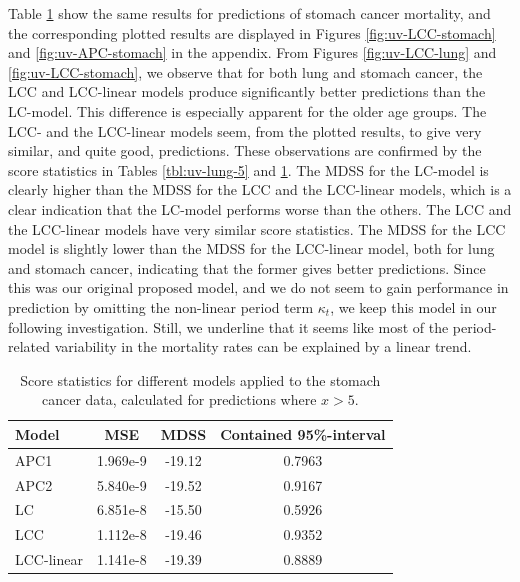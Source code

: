 Table \ref{tbl:uv-stomach-5} show the same results for predictions of stomach cancer mortality, and the corresponding plotted results are displayed in Figures \ref{fig:uv-LCC-stomach} and \ref{fig:uv-APC-stomach} in the appendix. 
\newpar From Figures \ref{fig:uv-LCC-lung} and \ref{fig:uv-LCC-stomach}, we observe that for both lung and stomach cancer, the LCC and LCC-linear models produce significantly better predictions than the LC-model. This difference is especially apparent for the older age groups. The LCC- and the LCC-linear models seem, from the plotted results, to give very similar, and quite good, predictions. These observations are confirmed by the score statistics in Tables \ref{tbl:uv-lung-5} and \ref{tbl:uv-stomach-5}. The MDSS for the LC-model is clearly higher than the MDSS for the LCC and the LCC-linear models, which is a clear indication that the LC-model performs worse than the others. The LCC and the LCC-linear models have very similar score statistics. The MDSS for the LCC model is slightly lower than the MDSS for the LCC-linear model, both for lung and stomach cancer, indicating that the former gives better predictions. Since this was our original proposed model, and we do not seem to gain performance in prediction by omitting the non-linear period term $\kappa_t$, we keep this model in our following investigation. Still, we underline that it seems like most of the period-related variability in the mortality rates can be explained by a linear trend.

\begin{table}
    \begin{center}
        \begin{tabular}{l |c c c }
            Model & MSE &   MDSS & Contained 95\%-interval\\
            \hline
            APC1     & 1.969e-9 & -19.12    & 0.7963 \\
            APC2     & 5.840e-9 & -19.52    & 0.9167 \\
            LC      & 6.851e-8 & -15.50    & 0.5926 \\
            LCC     & 1.112e-8 & -19.46    & 0.9352 \\
            LCC-linear      & 1.141e-8 & -19.39    & 0.8889
        \end{tabular}
        \caption{Score statistics for different models applied to the stomach cancer data, calculated for predictions where $x > 5$.}\label{tbl:uv-stomach-5}
    \end{center}
\end{table}


